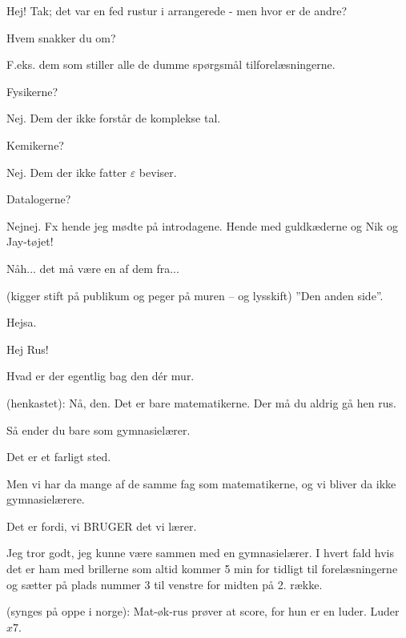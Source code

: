 \documentclass[a4paper,11pt]{article}
\begin{document}
\begin{sketch}

 Hej! Tak; det var en fed rustur i arrangerede - men hvor er de andre?

 Hvem snakker du om?

 F.eks. dem som stiller alle de dumme spørgsmål tilforelæsningerne.

 Fysikerne?

 Nej. Dem der ikke forstår de komplekse tal.

 Kemikerne?

 Nej. Dem der ikke fatter $\varepsilon$ beviser.

 Datalogerne?

 Nejnej. Fx hende jeg mødte på introdagene. Hende med guldkæderne og Nik og Jay-tøjet!

 Nåh... det må være en af dem fra...

 (kigger stift på publikum og peger på muren -- og lysskift) ''Den anden side''.


 Hejsa.

 Hej Rus!

 Hvad er der egentlig bag den dér mur.

 (henkastet): Nå, den. Det er bare matematikerne. Der må du aldrig gå hen rus.

 Så ender du bare som gymnasielærer.

 Det er et farligt sted.

 Men vi har da mange af de samme fag som matematikerne, og vi bliver da ikke gymnasielærere.

 Det er fordi, vi BRUGER det vi lærer.

 Jeg tror godt, jeg kunne være sammen med en gymnasielærer. I hvert fald hvis det er ham med brillerne som altid kommer 5 min for tidligt til forelæsningerne og sætter på plads nummer 3 til venstre for midten på 2. række.

 (synges på oppe i norge): Mat-øk-rus prøver at score, for hun er en luder. Luder $x7$.


\end{sketch}
\end{document}
